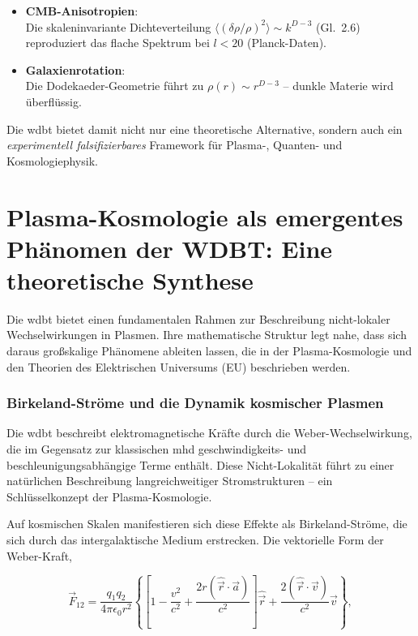 \begin{itemize}  
    \item \textbf{CMB-Anisotropien}:\\Die skaleninvariante Dichteverteilung $\langle (\delta\rho/\rho)^2 \rangle \sim k^{D-3}$ (Gl.~2.6) reproduziert das flache Spektrum bei $l < 20$ (Planck-Daten).  
    \item \textbf{Galaxienrotation}:\\Die Dodekaeder-Geometrie führt zu $\rho(r) \sim r^{D-3}$ – dunkle Materie wird überflüssig.  
\end{itemize}  

\noindent  
Die \gls{wdbt} bietet damit nicht nur eine theoretische Alternative, sondern auch ein \textit{experimentell falsifizierbares} Framework für Plasma-, Quanten- und Kosmologiephysik.

\section{Plasma-Kosmologie als emergentes Phänomen der WDBT: Eine theoretische Synthese}
Die \gls{wdbt} bietet einen fundamentalen Rahmen zur Beschreibung nicht-lokaler Wechselwirkungen in Plasmen. Ihre mathematische Struktur legt nahe, dass sich daraus großskalige
Phänomene ableiten lassen, die in der Plasma-Kosmologie und den Theorien des Elektrischen Universums (EU) beschrieben werden.

\subsubsection{Birkeland-Ströme und die Dynamik kosmischer Plasmen}
Die \gls{wdbt} beschreibt elektromagnetische Kräfte durch die Weber-Wechselwirkung, die im Gegensatz zur klassischen \gls{mhd} geschwindigkeits- und beschleunigungsabhängige
Terme enthält. Diese Nicht-Lokalität führt zu einer natürlichen Beschreibung langreichweitiger Stromstrukturen – ein Schlüsselkonzept der Plasma-Kosmologie.

Auf kosmischen Skalen manifestieren sich diese Effekte als Birkeland-Ströme, die sich durch das intergalaktische Medium erstrecken. Die vektorielle Form der Weber-Kraft,

\begin{equation}
\vec{F}_{12} = \frac{q_1 q_2}{4\pi\epsilon_0 r^2} 
\left\{ 
\left[1 - \frac{v^2}{c^2} + \frac{2r(\hat{\vec{r}}\cdot\vec{a})}{c^2}\right] \hat{\vec{r}}
+ \frac{2(\hat{\vec{r}}\cdot\vec{v})}{c^2} \vec{v} 
\right\},
\end{equation}

